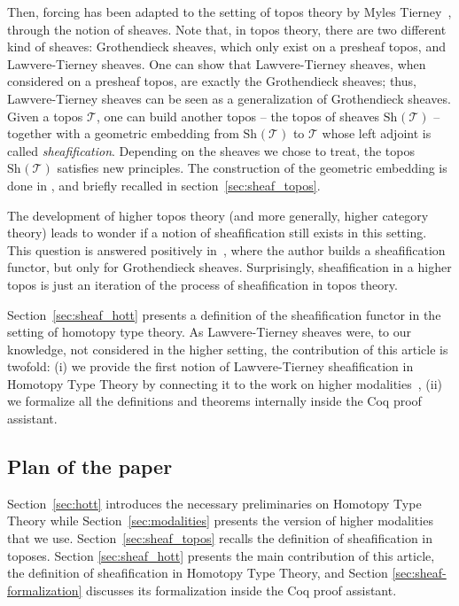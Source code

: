 \documentclass[notfinal]{jfrarticle}
\newcommand \Sh[1] {\mathrm{Sh}_{#1}}
\begin{document}
Then, forcing has been adapted to the setting of topos theory by Myles
Tierney~\cite{tierney1972}, through the notion of sheaves.  Note that,
in topos theory, there are two different kind of sheaves: Grothendieck
sheaves, which only exist on a presheaf topos, and Lawvere-Tierney
sheaves. One can show that Lawvere-Tierney sheaves, when considered on
a presheaf topos, are exactly the Grothendieck sheaves; thus,
Lawvere-Tierney sheaves can be seen as a generalization of
Grothendieck sheaves.  Given a topos $\mathcal T$, one can build
another topos -- the topos of sheaves $\Sh{}(\mathcal T)$ -- together
with a geometric embedding from $\Sh{}(\mathcal T)$ to $\mathcal T$
whose left adjoint is
called {\em sheafification}.  Depending on the sheaves we chose to treat,
the topos $\Sh{}(\mathcal T)$ satisfies new principles. The
construction of the geometric embedding is done in \cite[Section
V.3]{maclanemoerdijk}, and briefly recalled in
section~\ref{sec:sheaf_topos}.

The development of higher topos theory (and more generally, higher
category theory) leads to wonder if a notion of sheafification still
exists in this setting. This question is answered positively
in~\cite{lurie}, where the author builds a sheafification functor, but
only for Grothendieck sheaves. Surprisingly, sheafification in a
higher topos is just an iteration of the process of sheafification in
topos theory. 

Section~\ref{sec:sheaf_hott} presents a definition of the
sheafification functor in the setting of homotopy type theory. As
Lawvere-Tierney sheaves were, to our knowledge, not considered in the
higher setting, the contribution of this article is twofold: (i) we
provide the first notion of Lawvere-Tierney sheafification in Homotopy
Type Theory by connecting it to the work on higher
modalities~\cite{hottbook}, (ii) we formalize all the definitions and
theorems internally inside the Coq proof assistant.

\subsection*{Plan of the paper}

Section~\ref{sec:hott} introduces the necessary preliminaries on
Homotopy Type Theory while Section~\ref{sec:modalities} presents the
version of higher modalities that we
use. Section~\ref{sec:sheaf_topos} recalls the definition of
sheafification in toposes. Section \ref{sec:sheaf_hott} presents the
main contribution of this article, the definition of sheafification in
Homotopy Type Theory, and Section \ref{sec:sheaf-formalization}
discusses its formalization inside the Coq proof assistant. 
\end{document}
